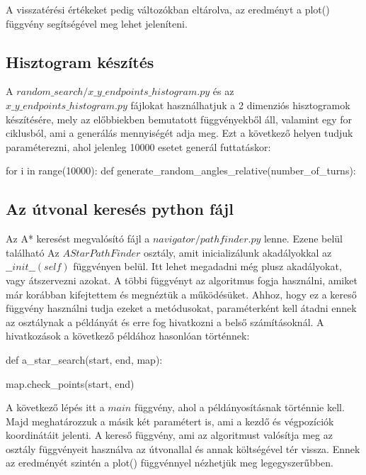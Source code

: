 A visszatérési értékeket pedig változókban eltárolva, az eredményt a plot() függvény segítségével meg lehet jeleníteni. 

\subsection{Hisztogram készítés}

A $ random\_search/x\_y\_endpoints\_histogram.py $ és az\\ $ x\_y\_endpoints\_histogram.py $ fájlokat használhatjuk a 2 dimenziós hisztogramok készítésére, mely az előbbiekben bemutatott függvényekből áll, valamint egy for ciklusból, ami a generálás mennyiségét adja meg. Ezt a következő helyen tudjuk paraméterezni, ahol jelenleg 10000 esetet generál futtatáskor:

\begin{python}
for i in range(10000):
    def generate_random_angles_relative(number_of_turns):
\end{python}


\subsection{Az útvonal keresés python fájl}

Az A* keresést megvalósító fájl a $ navigator/pathfinder.py $ lenne. Ezene belül található Az $ AStarPathFinder $ osztály, amit inicializálunk akadályokkal az $\_\_init\_\_(self)$ függvényen belül. Itt lehet megadadni még plusz akadályokat, vagy átszervezni azokat. A többi függvényt az algoritmus fogja használni, amiket már korábban kifejtettem és megnéztük a működésüket. Ahhoz, hogy ez a kereső függvény használni tudja ezeket a metódusokat, paraméterként kell átadni ennek az osztálynak a példányát és erre fog hivatkozni a belső számításoknál. A hivatkozások a következő példához hasonlóan történnek:

\begin{python}
def a_star_search(start, end, map):

	map.check_points(start, end)
\end{python}

A következő lépés itt a $ main $ függvény, ahol a példányosításnak történnie kell. Majd meghatározzuk a másik két paramétert is, ami a kezdő és végpozíciók koordinátáit jelenti. A kereső függvény, ami az algoritmust valósítja meg az osztály függvényeit használva az útvonallal és annak költségével tér vissza. Ennek az eredményét szintén a plot() függvénnyel nézhetjük meg legegyszerűbben.

